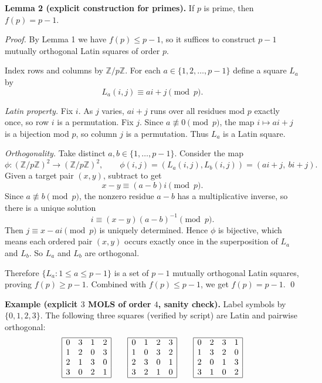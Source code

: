 \medskip

\textbf{Lemma 2 (explicit construction for primes).}
If $p$ is prime, then $f(p)=p-1$.

\emph{Proof.}
By Lemma 1 we have $f(p)\le p-1$, so it suffices to construct $p-1$ mutually orthogonal Latin squares of order $p$.

Index rows and columns by $\mathbb Z/p\mathbb Z$.
For each $a\in\{1,2,\dots,p-1\}$ define a square $L_a$ by
\[
L_a(i,j) \equiv ai + j \pmod p.
\]

\emph{Latin property.}
Fix $i$. As $j$ varies, $ai+j$ runs over all residues mod $p$ exactly once, so row $i$ is a permutation.
Fix $j$. Since $a\not\equiv 0\pmod p$, the map $i\mapsto ai+j$ is a bijection mod $p$, so column $j$ is a permutation.
Thus $L_a$ is a Latin square.

\emph{Orthogonality.}
Take distinct $a,b\in\{1,\dots,p-1\}$. Consider the map
\[
\phi: (\mathbb Z/p\mathbb Z)^2 \to (\mathbb Z/p\mathbb Z)^2,\qquad \phi(i,j)=(L_a(i,j),L_b(i,j))=(ai+j,\ bi+j).
\]
Given a target pair $(x,y)$, subtract to get
\[
 x-y \equiv (a-b)i \pmod p.
\]
Since $a\not\equiv b\pmod p$, the nonzero residue $a-b$ has a multiplicative inverse, so there is a unique solution
\[
 i \equiv (x-y)(a-b)^{-1} \pmod p.
\]
Then $j\equiv x-ai\pmod p$ is uniquely determined.
Hence $\phi$ is bijective, which means each ordered pair $(x,y)$ occurs exactly once in the superposition of $L_a$ and $L_b$.
So $L_a$ and $L_b$ are orthogonal.

Therefore $\{L_a:1\le a\le p-1\}$ is a set of $p-1$ mutually orthogonal Latin squares, proving $f(p)\ge p-1$.
Combined with $f(p)\le p-1$, we get $f(p)=p-1$.
\qed

\medskip

\textbf{Example (explicit $3$ MOLS of order $4$, sanity check).}
Label symbols by $\{0,1,2,3\}$. The following three squares (verified by script) are Latin and pairwise orthogonal:
\[
\begin{array}{c}
\begin{array}{|cccc|}\hline
0&3&1&2\\
1&2&0&3\\
2&1&3&0\\
3&0&2&1\\\hline
\end{array}
\qquad
\begin{array}{|cccc|}\hline
0&1&2&3\\
1&0&3&2\\
2&3&0&1\\
3&2&1&0\\\hline
\end{array}
\qquad
\begin{array}{|cccc|}\hline
0&2&3&1\\
1&3&2&0\\
2&0&1&3\\
3&1&0&2\\\hline
\end{array}
\end{array}
\]

